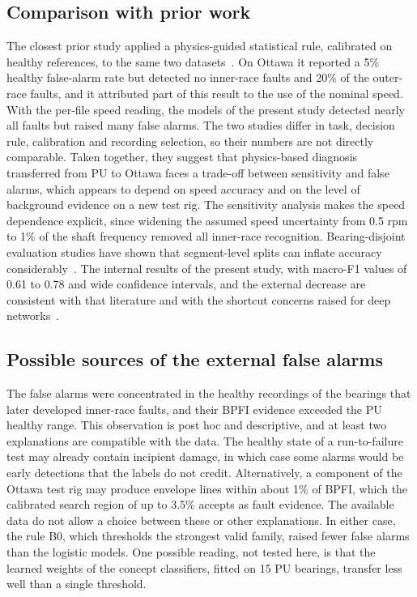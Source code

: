 \documentclass[10pt,letterpaper]{article}
\begin{document}
\subsection*{Comparison with prior work}
The closest prior study applied a physics-guided statistical rule, calibrated on healthy references, to the same two datasets~\cite{siddique2026physics}. On Ottawa it reported a 5\% healthy false-alarm rate but detected no inner-race faults and 20\% of the outer-race faults, and it attributed part of this result to the use of the nominal speed. With the per-file speed reading, the models of the present study detected nearly all faults but raised many false alarms. The two studies differ in task, decision rule, calibration and recording selection, so their numbers are not directly comparable. Taken together, they suggest that physics-based diagnosis transferred from PU to Ottawa faces a trade-off between sensitivity and false alarms, which appears to depend on speed accuracy and on the level of background evidence on a new test rig. The sensitivity analysis makes the speed dependence explicit, since widening the assumed speed uncertainty from 0.5 rpm to 1\% of the shaft frequency removed all inner-race recognition. Bearing-disjoint evaluation studies have shown that segment-level splits can inflate accuracy considerably~\cite{hendriks2022towards,wheat2024impact,vieira2026towards}. The internal results of the present study, with macro-F1 values of 0.61 to 0.78 and wide confidence intervals, and the external decrease are consistent with that literature and with the shortcut concerns raised for deep networks~\cite{geirhos2020shortcut,kapoor2023leakage}.

\subsection*{Possible sources of the external false alarms}
The false alarms were concentrated in the healthy recordings of the bearings that later developed inner-race faults, and their BPFI evidence exceeded the PU healthy range. This observation is post hoc and descriptive, and at least two explanations are compatible with the data. The healthy state of a run-to-failure test may already contain incipient damage, in which case some alarms would be early detections that the labels do not credit. Alternatively, a component of the Ottawa test rig may produce envelope lines within about 1\% of BPFI, which the calibrated search region of up to 3.5\% accepts as fault evidence. The available data do not allow a choice between these or other explanations. In either case, the rule B0, which thresholds the strongest valid family, raised fewer false alarms than the logistic models. One possible reading, not tested here, is that the learned weights of the concept classifiers, fitted on 15 PU bearings, transfer less well than a single threshold.
\end{document}
